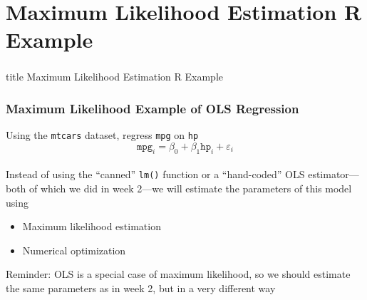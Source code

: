 \documentclass{beamer}\usepackage[]{graphicx}\usepackage[]{xcolor}
\begin{document}
\section{Maximum Likelihood Estimation R Example}
\label{example}
\begin{frame}\frametitle{}
    \vfill
    \centering
    \begin{beamercolorbox}[center]{title}
        \Large Maximum Likelihood Estimation R Example
    \end{beamercolorbox}
    \vfill
\end{frame}

\begin{frame}\frametitle{Maximum Likelihood Example of OLS Regression}
    Using the \texttt{mtcars} dataset, regress \texttt{mpg} on \texttt{hp}
    $$\texttt{mpg}_i = \beta_0 + \beta_1 \texttt{hp}_i + \varepsilon_i$$ \\
    \vspace{3ex}
    Instead of using the ``canned'' \texttt{lm()} function or a ``hand-coded'' OLS estimator---both of which we did in week 2---we will estimate the parameters of this model using
    \begin{itemize}
        \item Maximum likelihood estimation
        \item Numerical optimization
    \end{itemize}
    \vspace{3ex}
    Reminder: OLS is a special case of maximum likelihood, so we should estimate the same parameters as in week 2, but in a very different way
\end{frame}
\end{document}
